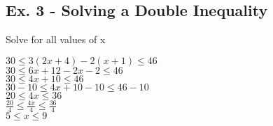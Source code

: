 \documentclass[11pt]{article}
\begin{document}
\subsection*{Ex. 3 - Solving a Double Inequality}
\label{sec:orgf16ab1a}

Solve for all values of x

\(30 \le 3(2x+4)-2(x+1) \le 46\)\\
\(30 \le 6x+12-2x-2 \le 46\)\\
\(30 \le 4x+10 \le 46\)\\
\(30-10 \le 4x+10-10 \le 46-10\)\\
\(20 \le 4x \le 36\)\\
\(\frac{20}{4} \le \frac{4x}{4} \le \frac{36}{4}\)\\
\(5 \le x \le 9\)
\end{document}
